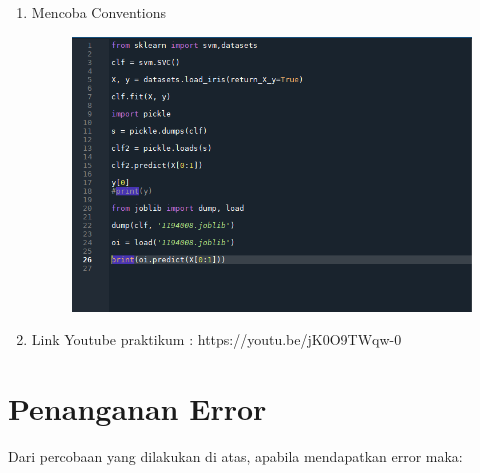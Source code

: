 \begin{enumerate}
\begin{figure}[!htbp]
	\end{figure}
	\newpage
	\item 
	Mencoba Conventions
	\begin{figure}[!htbp]
		\centering
		\includegraphics[scale=0.4]{figures/4.PNG}
	\end{figure}
	\newpage
	\item Link Youtube praktikum : https://youtu.be/jK0O9TWqw-0
\end{enumerate}


\section{Penanganan Error}
Dari percobaan yang dilakukan di atas, apabila mendapatkan error maka:


